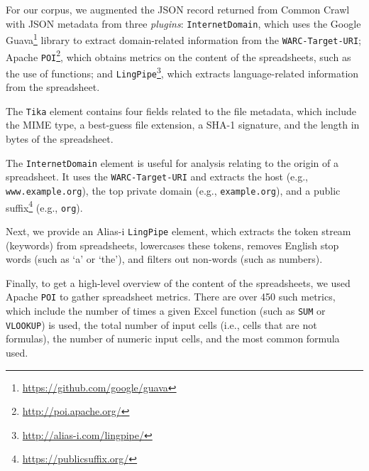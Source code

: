 \documentclass[conference]{IEEEtran}
\begin{document}

For our corpus, we augmented the JSON record returned from Common Crawl with JSON metadata from three \textit{plugins}: 
\texttt{InternetDomain}, which uses the Google Guava\footnote{\url{https://github.com/google/guava}} library to extract domain-related information from the \texttt{WARC-Target-URI};
Apache \texttt{POI}\footnote{\url{http://poi.apache.org/}}, which obtains metrics on the content of the spreadsheets, such as the use of functions;
and \texttt{LingPipe}\footnote{\url{http://alias-i.com/lingpipe/}}, which extracts language-related information from the spreadsheet. 

The \texttt{Tika} element contains four fields related to the file metadata, which include the MIME type, a best-guess file extension, a SHA-1 signature, and the length in bytes of the spreadsheet.

The \texttt{InternetDomain} element is useful for analysis relating to the origin of a spreadsheet. It uses the \texttt{WARC-Target-URI} and extracts the host (e.g., \texttt{www.example.org}), the top private domain (e.g., \texttt{example.org}), and a public suffix\footnote{\url{https://publicsuffix.org/}} (e.g., \texttt{org}).

Next, we provide an Alias-i \texttt{LingPipe} element, which extracts the token stream (keywords) from spreadsheets, lowercases these tokens, removes English stop words (such as `a' or `the'), and filters out non-words (such as numbers).

Finally, to get a high-level overview of the content of the spreadsheets, we used Apache \texttt{POI} to gather spreadsheet metrics. 
There are over 450 such metrics, which include the number of times a given Excel function (such as \texttt{SUM} or \texttt{VLOOKUP}) is used, the total number of input cells (i.e., cells that are not formulas), the number of numeric input cells, and the most common formula used. 
\end{document}
